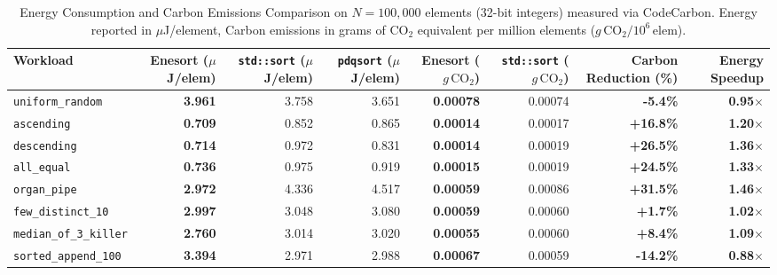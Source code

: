 \begin{table}[t]
\centering
\caption{Energy Consumption and Carbon Emissions Comparison on $N=100,000$ elements (32-bit integers) measured via CodeCarbon. Energy reported in $\mu$J/element, Carbon emissions in grams of $\text{CO}_2$ equivalent per million elements ($g\,\text{CO}_2 / 10^6\,\text{elem}$).}
\label{tab:carbon_results}
\begin{tabular}{lrrrrrrr}
\toprule
Workload & Enesort ($\mu$J/elem) & \texttt{std::sort} ($\mu$J/elem) & \texttt{pdqsort} ($\mu$J/elem) & Enesort ($g\,\text{CO}_2$) & \texttt{std::sort} ($g\,\text{CO}_2$) & Carbon Reduction (\%) & Energy Speedup \\
\midrule
\texttt{uniform_random} & \textbf{3.961} & 3.758 & 3.651 & \textbf{0.00078} & 0.00074 & \textbf{-5.4\%} & \textbf{0.95$\times$} \\
\texttt{ascending} & \textbf{0.709} & 0.852 & 0.865 & \textbf{0.00014} & 0.00017 & \textbf{+16.8\%} & \textbf{1.20$\times$} \\
\texttt{descending} & \textbf{0.714} & 0.972 & 0.831 & \textbf{0.00014} & 0.00019 & \textbf{+26.5\%} & \textbf{1.36$\times$} \\
\texttt{all_equal} & \textbf{0.736} & 0.975 & 0.919 & \textbf{0.00015} & 0.00019 & \textbf{+24.5\%} & \textbf{1.33$\times$} \\
\texttt{organ_pipe} & \textbf{2.972} & 4.336 & 4.517 & \textbf{0.00059} & 0.00086 & \textbf{+31.5\%} & \textbf{1.46$\times$} \\
\texttt{few_distinct_10} & \textbf{2.997} & 3.048 & 3.080 & \textbf{0.00059} & 0.00060 & \textbf{+1.7\%} & \textbf{1.02$\times$} \\
\texttt{median_of_3_killer} & \textbf{2.760} & 3.014 & 3.020 & \textbf{0.00055} & 0.00060 & \textbf{+8.4\%} & \textbf{1.09$\times$} \\
\texttt{sorted_append_100} & \textbf{3.394} & 2.971 & 2.988 & \textbf{0.00067} & 0.00059 & \textbf{-14.2\%} & \textbf{0.88$\times$} \\
\bottomrule
\end{tabular}
\end{table}
